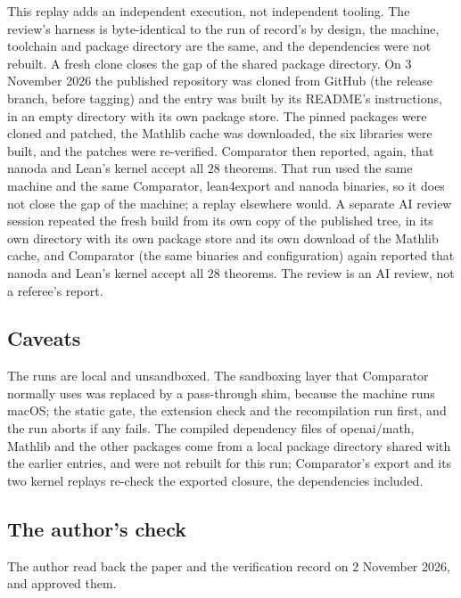 \documentclass[11pt]{article}
\theoremstyle{definition}
\begin{document}
This replay adds an independent execution, not independent tooling. The review's harness is byte-identical to the run of record's by design, the machine, toolchain and package directory are the same, and the dependencies were not rebuilt. A fresh clone closes the gap of the shared package directory. On 3 November 2026 the published repository was cloned from GitHub (the release branch, before tagging) and the entry was built by its README's instructions, in an empty directory with its own package store. The pinned packages were cloned and patched, the Mathlib cache was downloaded, the six libraries were built, and the patches were re-verified. Comparator then reported, again, that nanoda and Lean's kernel accept all $28$ theorems. That run used the same machine and the same Comparator, lean4export and nanoda binaries, so it does not close the gap of the machine; a replay elsewhere would. A separate AI review session repeated the fresh build from its own copy of the published tree, in its own directory with its own package store and its own download of the Mathlib cache, and Comparator (the same binaries and configuration) again reported that nanoda and Lean's kernel accept all $28$ theorems. The review is an AI review, not a referee's report.

\subsection{Caveats}\label{sec:caveats}

The runs are local and unsandboxed. The sandboxing layer that Comparator normally uses was replaced by a pass-through shim, because the machine runs macOS; the static gate, the extension check and the recompilation run first, and the run aborts if any fails. The compiled dependency files of openai/math, Mathlib and the other packages come from a local package directory shared with the earlier entries, and were not rebuilt for this run; Comparator's export and its two kernel replays re-check the exported closure, the dependencies included.

\subsection{The author's check}\label{sec:authorcheck}

The author read back the paper and the verification record on 2 November 2026, and approved them.

\end{document}
